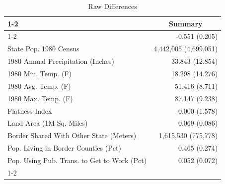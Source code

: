 \begin{table}[!h]
\caption{Raw Differences}
\centering
\begin{tabular}{ll}
\cline{1-2}
\multicolumn{1}{r}{} &
  \multicolumn{1}{c}{Summary} \\
\cline{1-2}
\multicolumn{1}{l}{Elasticity (Table 9)} &
  \multicolumn{1}{r}{-0.551 (0.205)} \\
\multicolumn{1}{l}{State Pop. 1980 Census} &
  \multicolumn{1}{r}{4,442,005 (4,699,051)} \\
\multicolumn{1}{l}{1980 Annual Precipitation (Inches)} &
  \multicolumn{1}{r}{33.843 (12.854)} \\
\multicolumn{1}{l}{1980 Min. Temp. (F)} &
  \multicolumn{1}{r}{18.298 (14.276)} \\
\multicolumn{1}{l}{1980 Avg. Temp. (F)} &
  \multicolumn{1}{r}{51.416 (8.711)} \\
\multicolumn{1}{l}{1980 Max. Temp. (F)} &
  \multicolumn{1}{r}{87.147 (9.238)} \\
\multicolumn{1}{l}{Flatness Index} &
  \multicolumn{1}{r}{-0.000 (1.578)} \\
\multicolumn{1}{l}{Land Area (1M Sq. Miles)} &
  \multicolumn{1}{r}{0.069 (0.086)} \\
\multicolumn{1}{l}{Border Shared With Other State (Meters)} &
  \multicolumn{1}{r}{1,615,530 (775,778)} \\
\multicolumn{1}{l}{Pop. Living in Border Counties (Pct)} &
  \multicolumn{1}{r}{0.465 (0.274)} \\
\multicolumn{1}{l}{Pop. Using Pub. Trans. to Get to Work (Pct)} &
  \multicolumn{1}{r}{0.052 (0.072)} \\
\cline{1-2}
\end{tabular}
\end{table}
